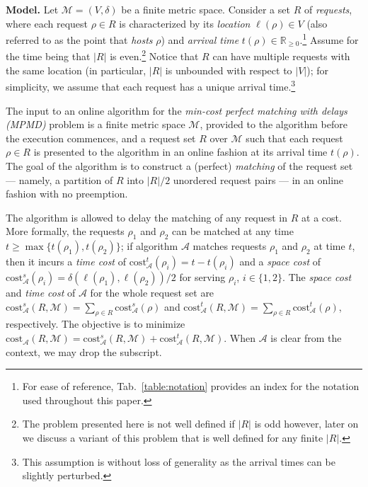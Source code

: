 \documentclass[11pt]{article}
\renewcommand{\paragraph}[1]{\par\noindent\textbf{#1}}
\theoremstyle{definition}
\theoremstyle{plain}
\theoremstyle{definition}
\theoremstyle{plain}
\theoremstyle{definition}
\theoremstyle{plain}
\newcommand{\NotationLabel}[1]{\label{notationTable:#1}\ignorespaces}
\newcommand{\Tabl}{Tab.}
\newcommand{\Location}{\ell}
\newcommand{\aTime}{\mathit{t}}
\newcommand{\Reals}{\mathbb{R}}
\newcommand{\sCost}{\mathrm{cost}^{\mathit{s}}}
\newcommand{\tCost}{\mathrm{cost}^{\mathit{t}}}
\newcommand{\Cost}{\mathrm{cost}}
\newcommand{\A}{\mathcal{A}}
\begin{document}
\paragraph{Model.}
Let
$\mathcal{M} = (V, \delta)$
be a finite metric space.
Consider a set $R$ of \emph{requests}, where each request $\rho \in R$
is characterized by its \emph{location}
$\Location(\rho) \in V$
\NotationLabel{model:location}
(also referred to as the point that \emph{hosts} $\rho$) and \emph{arrival
time}
$\aTime(\rho) \in \Reals_{\geq 0}$.\footnote{
For ease of reference, \Tabl{}~\ref{table:notation} provides an index for the
notation used throughout this paper.
}
\NotationLabel{model:arrival-time}
Assume for the time being that $|R|$ is even.\footnote{%
The problem presented here is not well defined if $|R|$ is odd however, later
on we discuss a variant of this problem that is well defined for any finite
$|R|$.
}
Notice that $R$ can have multiple requests with the same location (in
particular, $|R|$ is unbounded with respect to $|V|$);
for simplicity, we assume that each request has a unique arrival
time.\footnote{%
This assumption is without loss of generality as the arrival times can be
slightly perturbed.
}

The input to an online algorithm for the \emph{min-cost perfect matching with
delays (MPMD)} problem is a finite metric space $\mathcal{M}$,
provided to the algorithm before the execution commences, and a request set
$R$ over $\mathcal{M}$ such that each request $\rho \in R$ is presented to
the algorithm in an online fashion at its arrival time
$\aTime(\rho)$.
The goal of the algorithm is to construct a (perfect) \emph{matching} of the
request set --- namely, a partition of $R$ into $|R| / 2$ unordered request
pairs --- in an online fashion with no preemption.

The algorithm is allowed to delay the matching of any request in $R$ at a
cost.
More formally, the requests $\rho_{1}$ and $\rho_{2}$ can be matched at any time
$t \geq \max \{ \aTime(\rho_{1}), \aTime(\rho_{2}) \}$;
if algorithm $\A$ matches requests $\rho_{1}$ and $\rho_{2}$ at time $t$,
then it incurs a \emph{time cost} of
$\tCost_{\A}(\rho_{i}) = t - \aTime(\rho_{i})$
\NotationLabel{model:time-cost-request}
and a \emph{space cost} of
$\sCost_{\A}(\rho_{i}) = \delta(\Location(\rho_{1}), \Location(\rho_{2})) / 2$
\NotationLabel{model:space-cost-request}
for serving $\rho_{i}$,
$i \in \{ 1, 2 \}$.
The \emph{space cost} and \emph{time cost} of $\A$ for the whole request set
are
$\sCost_{\A}(R, \mathcal{M})
=
\sum_{\rho \in R} \sCost_{\A}(\rho)$
\NotationLabel{model:space-cost-instance}
and
$\tCost_{\A}(R, \mathcal{M})
=
\sum_{\rho \in R} \tCost_{\A}(\rho)$,
\NotationLabel{model:time-cost-instance}
respectively.
The objective is to minimize
$\Cost_{\A}(R, \mathcal{M}) = \sCost_{\A}(R, \mathcal{M}) + \tCost_{\A}(R,
\mathcal{M})$.
\NotationLabel{model:total-cost}
When $\A$ is clear from the context, we may drop the subscript.
\end{document}
